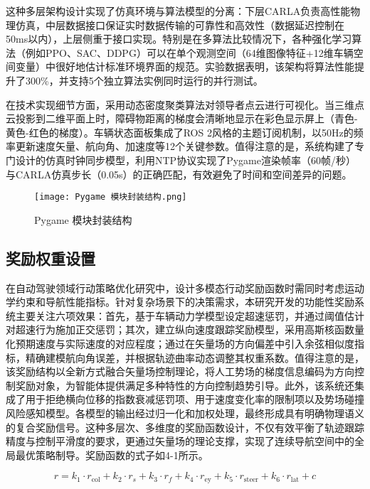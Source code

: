 这种多层架构设计实现了仿真环境与算法模型的分离：下层CARLA负责高性能物理仿真，中层数据接口保证实时数据传输的可靠性和高效性（数据延迟控制在50ms以内），上层侧重于接口实现。特别是在多算法比较情况下，各种强化学习算法（例如PPO、SAC、DDPG）可以在单个观测空间（64维图像特征+12维车辆空间变量）中很好地估计标准环境界面的规范。实验数据表明，该架构将算法性能提升了300\%，并支持5个独立算法实例同时运行的并行测试。

在技​​术实现细节方面，采用动态密度聚类算法对领导者点云进行可视化。当三维点云投影到二维平面上时，障碍物距离的梯度会清晰地显示在彩色显示屏上（青色-黄色-红色的梯度）。车辆状态面板集成了ROS 2风格的主题订阅机制，以50Hz的频率更新速度矢量、航向角、加速度等12个关键参数。值得注意的是，系统构建了专门设计的仿真时钟同步模型，利用NTP协议实现了Pygame渲染帧率（60帧/秒）与CARLA仿真步长（0.05s）的正确匹配，有效避免了时间和空间差异的问题。

\begin{figure}[hbt]
	\centering
	\texttt{[image: Pygame 模块封装结构.png]}
	\caption{Pygame 模块封装结构}
	\label{f.example}
\end{figure}

\subsection{奖励权重设置}

在自动驾驶领域行动策略优化研究中，设计多模态行动奖励函数时需同时考虑运动学约束和导航性能指标。针对复杂场景下的决策需求，本研究开发的功能性奖励系统主要关注六项效果：首先，基于车辆动力学模型设定超速惩罚，并通过阈值估计对超速行为施加正交惩罚；其次，建立纵向速度跟踪奖励模型，采用高斯核函数量化预期速度与实际速度的对应程度；通过在矢量场的方向偏差中引入余弦相似度指标，精确建模航向角误差，并根据轨迹曲率动态调整其权重系数。值得注意的是，该奖励结构以全新方式融合矢量场控制理论，将人工势场的梯度信息编码为方向控制奖励对象，为智能体提供满足多种特性的方向控制趋势引导。此外，该系统还集成了用于拒绝横向位移的指数衰减惩罚项、用于速度变化率的限制项以及势场碰撞风险感知模型。各模型的输出经过归一化和加权处理，最终形成具有明确物理语义的复合奖励信号。这种多层次、多维度的奖励函数设计，不仅有效平衡了轨迹跟踪精度与控制平滑度的要求，更通过矢量场的理论支撑，实现了连续导航空间中的全局最优策略制导。奖励函数的式子如4-1所示。

\begin{equation}
	r = k_1 \cdot r_{\text{col}} + k_2 \cdot r_s + k_3 \cdot r_f + k_4 \cdot r_{\text{ey}} + k_5 \cdot r_{\text{steer}} + k_6 \cdot r_{\text{lat}} + c
\end{equation}

